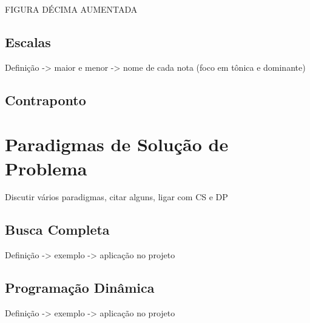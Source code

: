         FIGURA DÉCIMA AUMENTADA

    \subsection[Escalas]{Escalas}
      Definição -> maior e menor -> nome de cada nota (foco em tônica e dominante)


    \subsection[Contraponto]{Contraponto}

  \section[Paradigmas de Solução de Problema]{Paradigmas de Solução de Problema}
    Discutir vários paradigmas, citar alguns, ligar com CS e DP

    \subsection[Busca Completa]{Busca Completa}
      Definição -> exemplo -> aplicação no projeto
    \subsection[Programação Dinâmica]{Programação Dinâmica}
      Definição -> exemplo -> aplicação no projeto
